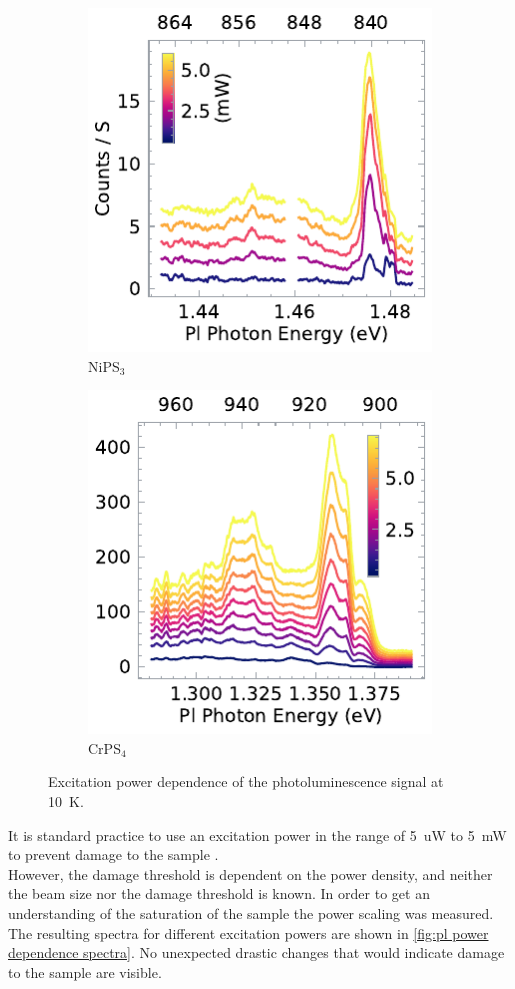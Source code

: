 \documentclass[
	oneside,
	parskip=half,
	a4paper,
]{scrbook}
\begin{document}
\begin{figure}
	\centering
	\begin{subfigure}{2.5in}
		\includegraphics{../figures/2024-04-06 NiPS3 excitation power dependence.pdf}
		\caption{NiPS$_3$}
	\end{subfigure}
	\begin{subfigure}{2.5in}
		\includegraphics{../figures/2023-12-14 CrPS4 excitation power dependence.pdf}
		\caption{CrPS$_4$}
	\end{subfigure}
	\caption{Excitation power dependence of the photoluminescence signal at \SI{10}{K}.}
	\label{fig:pl power dependence spectra}
\end{figure}
It is standard practice to use an excitation power in the range of \SI{5}{uW} to \SI{5}{mW} to prevent damage to the sample \cite{NiPS3_anisotropic, NiPS3_exciton}.\\
However, the damage threshold is dependent on the power density, and neither the beam size nor the damage threshold is known.
In order to get an understanding of the saturation of the sample the power scaling was measured.\\
The resulting spectra for different excitation powers are shown in \autoref{fig:pl power dependence spectra}.
No unexpected drastic changes that would indicate damage to the sample are visible.\\
\end{document}
